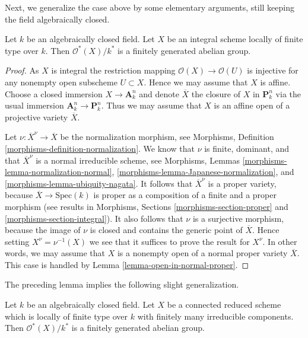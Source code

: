 \noindent
Next, we generalize the case above by some elementary arguments, still
keeping the field algebraically closed.

\begin{lemma}
\label{lemma-units-integral-finite-type-algebraically-closed}
Let $k$ be an algebraically closed field.
Let $X$ be an integral scheme locally of finite type over $k$.
Then $\mathcal{O}^*(X)/k^*$ is a finitely generated abelian group.
\end{lemma}

\begin{proof}
As $X$ is integral the restriction mapping
$\mathcal{O}(X) \to \mathcal{O}(U)$ is injective for any
nonempty open subscheme $U \subset X$. Hence we may assume
that $X$ is affine. Choose a closed immersion
$X \to \mathbf{A}^n_k$
and denote $\overline{X}$ the closure of $X$ in $\mathbf{P}^n_k$
via the usual immersion $\mathbf{A}^n_k \to \mathbf{P}^n_k$.
Thus we may assume that $X$ is an affine open of a projective
variety $\overline{X}$.

\medskip\noindent
Let $\nu : \overline{X}^\nu \to \overline{X}$ be the normalization
morphism, see
Morphisms, Definition \ref{morphisms-definition-normalization}.
We know that $\nu$ is finite, dominant, and that $\overline{X}^\nu$
is a normal irreducible scheme, see
Morphisms, Lemmas \ref{morphisms-lemma-normalization-normal},
\ref{morphisms-lemma-Japanese-normalization}, and
\ref{morphisms-lemma-ubiquity-nagata}.
It follows that $\overline{X}^\nu$ is a proper variety,
because $\overline{X} \to \text{Spec}(k)$ is proper as a composition
of a finite and a proper morphism (see results in
Morphisms, Sections \ref{morphisms-section-proper} and
\ref{morphisms-section-integral}).
It also follows that $\nu$ is a surjective morphism, because
the image of $\nu$ is closed and contains the generic point of $\overline{X}$.
Hence setting $X^\nu = \nu^{-1}(X)$ we see that it suffices to prove the
result for $X^\nu$. In other words, we may assume that $X$ is a nonempty
open of a normal proper variety $\overline{X}$. This case is handled by
Lemma \ref{lemma-open-in-normal-proper}.
\end{proof}

\noindent
The preceding lemma implies the following slight generalization.

\begin{lemma}
\label{lemma-units-general-algebraically-closed}
Let $k$ be an algebraically closed field.
Let $X$ be a connected reduced scheme which is locally of finite type
over $k$ with finitely many irreducible components.
Then $\mathcal{O}^*(X)/k^*$ is a finitely generated abelian group.
\end{lemma}

